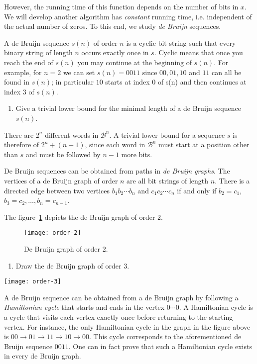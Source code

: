 \documentclass[11pt]{article}
\begin{document}
However, the running time of this function depends on the number of bits in $x$. We will
develop another algorithm has \emph{constant} running time, i.e. independent of the actual number
of zeros. To this end, we study \emph{de Bruijn} sequences. 

A de Bruijn sequence $s(n)$ of order
$n$ is a cyclic bit string such that every binary string of length $n$ occurs exactly once in $s$.
Cyclic means that once you reach the end of $s(n)$ you may continue at the beginning of $s(n)$.
For example, for $n = 2$ we can set $s(n) = 0011$ since $00, 01, 10$ and $11$ can all be found in
$s(n)$; in particular $10$ starts at index $0$ of s(n) and then continues at index $3$ of $s(n)$.


\begin{enumerate} \addtocounter{enumi}{1}
	\item Give a trivial lower bound for the minimal length of a de Bruijn sequence $s(n)$.
\end{enumerate}
\begin{solution}
	There are $ 2^n $ different words in $\mathcal{B}^n $.
	A trivial lower bound for a sequence $s$ is therefore
	of $ 2^n + (n-1) $, since each word in $ \mathcal{B}^n$
	must start at a position other than $s$ and must be followed
	by $n-1$ more bits.
\end{solution}

De Bruijn sequences can be obtained from paths in \emph{de Bruijn graphs}. The vertices of a de Bruijn graph of order $n$ are all bit strings of length $n$. There is a
directed edge between two vertices $b_1b_2 \cdots b_n$ and $c_1c_2 \cdots c_n$ if and only if $b_2 = c_1$, $b_3 = c_2, \ldots , b_n = c_{n-1}$.   

The figure~\ref{DeBruijnOrdre2} depicts the de Bruijn graph of order $2$.

\begin{figure}[h]
	\centering
	\texttt{[image: order-2]}
	\caption{\label{DeBruijnOrdre2}De Bruijn graph of order $2$.}
\end{figure}

\begin{enumerate}\addtocounter{enumi}{2}
	\item Draw the de Bruijn graph of order $3$.
\end{enumerate}
\begin{solution}
	\centerline{\texttt{[image: order-3]}}
\end{solution}


A de Bruijn sequence can be obtained from a de Bruijn graph by following
a \emph{Hamiltonian cycle} that starts and ends in the vertex $0 \cdots 0$. A Hamiltonian cycle is
a cycle that visits each vertex exactly once before returning to the starting vertex. For
instance, the only Hamiltonian cycle in the graph in the figure above is $00 \rightarrow 01 \rightarrow
11 \rightarrow 10 \rightarrow 00$. This cycle corresponds to the aforementioned de Bruijn sequence $0011$.
One can in fact prove that such a Hamiltonian cycle exists in every de Bruijn graph.%
\end{document}
